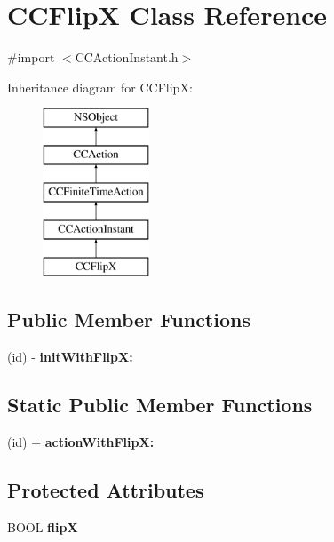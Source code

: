 \hypertarget{interface_c_c_flip_x}{\section{C\-C\-Flip\-X Class Reference}
\label{interface_c_c_flip_x}
}


{\ttfamily \#import $<$C\-C\-Action\-Instant.\-h$>$}

Inheritance diagram for C\-C\-Flip\-X\-:\begin{figure}[H]
\begin{center}
\leavevmode
\includegraphics[height=5.000000cm]{interface_c_c_flip_x}
\end{center}
\end{figure}
\subsection*{Public Member Functions}
\begin{DoxyCompactItemize}
\item 
\hypertarget{interface_c_c_flip_x_a890f62de55257d753d3a9f0aec9c480a}{(id) -\/ {\bfseries init\-With\-Flip\-X\-:}}\label{interface_c_c_flip_x_a890f62de55257d753d3a9f0aec9c480a}

\end{DoxyCompactItemize}
\subsection*{Static Public Member Functions}
\begin{DoxyCompactItemize}
\item 
\hypertarget{interface_c_c_flip_x_a35cf9892d0699f2a9b76d60510d456c3}{(id) + {\bfseries action\-With\-Flip\-X\-:}}\label{interface_c_c_flip_x_a35cf9892d0699f2a9b76d60510d456c3}

\end{DoxyCompactItemize}
\subsection*{Protected Attributes}
\begin{DoxyCompactItemize}
\item 
\hypertarget{interface_c_c_flip_x_a165c6ebebed6525884203ef0ef6eb0c1}{B\-O\-O\-L {\bfseries flip\-X}}\label{interface_c_c_flip_x_a165c6ebebed6525884203ef0ef6eb0c1}

\end{DoxyCompactItemize}


